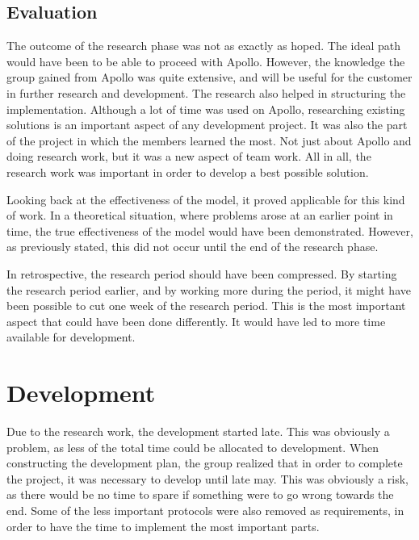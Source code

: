 \subsection{Evaluation}
\label{subsec:project_evaluation-research_phase-evaluation}

The outcome of the research phase was not as exactly as hoped. The ideal path would have been to be able to proceed with Apollo. However, the knowledge the group gained from Apollo was quite extensive, and will be useful for the customer in further research and development. The research also helped in structuring the implementation. Although a lot of time was used on Apollo, researching existing solutions is an important aspect of any development project. It was also the part of the project in which the members learned the most. Not just about Apollo and doing research work, but it was a new aspect of team work. All in all, the research work was important in order to develop a best possible solution.

Looking back at the effectiveness of the model, it proved applicable for this kind of work. In a theoretical situation, where problems arose at an earlier point in time, the true effectiveness of the model would have been demonstrated. However, as previously stated, this did not occur until the end of the research phase.

In retrospective, the research period should have been compressed. By starting the research period earlier, and by working more during the period, it might have been possible to cut one week of the research period. This is the most important aspect that could have been done differently. It would have led to more time available for development.

\section{Development}
\label{sec:project_evaluation-development}

Due to the research work, the development started late. This was obviously a problem, as less of the total time could be allocated to development. When constructing the development plan, the group realized that in order to complete the project, it was necessary to develop until late may. This was obviously a risk, as there would be no time to spare if something were to go wrong towards the end. Some of the less important protocols were also removed as requirements, in order to have the time to implement the most important parts.

